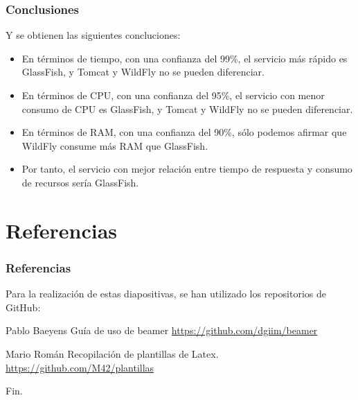 \documentclass[12pt, aspectratio=169]{beamer} %
\begin{document}
	\begin{frame}
		\frametitle{Conclusiones}
		
		Y se obtienen las siguientes concluciones:
		
		\begin{itemize}
			\item En términos de tiempo, con una confianza del 99\%, el servicio más rápido es GlassFish, y
			Tomcat y WildFly no se pueden diferenciar.
			\item En términos de CPU, con una confianza del 95\%, el servicio con menor consumo de CPU es GlassFish,
			y Tomcat y WildFly no se pueden diferenciar.
			\item En términos de RAM, con una confianza del 90\%, sólo podemos afirmar que WildFly consume más RAM que GlassFish.
			\item Por tanto, el servicio con mejor relación entre tiempo de respuesta y consumo de recursos sería GlassFish.
		\end{itemize} 
	\end{frame}

\section{Referencias}
	\begin{frame}
		\frametitle{Referencias}
		
		Para la realización de estas diapositivas, se han utilizado los repositorios de GitHub:
		
		\footnotesize{
		  \begin{thebibliography}{7} %
		     Pablo Baeyens
		      \newblock Guía de uso de beamer
		      \newblock \url{https://github.com/dgiim/beamer}
		      
		     Mario Román
		      \newblock Recopilación de plantillas de Latex.
		      \newblock \url{https://github.com/M42/plantillas}
		  \end{thebibliography}
		}
	\end{frame}


\begin{frame}
\Huge{\centerline{Fin.}}
\end{frame}

\end{document}
